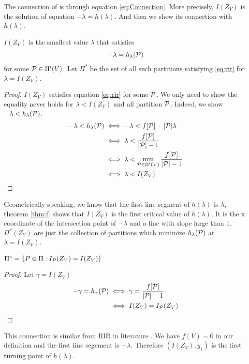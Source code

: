 \documentclass{article}
\begin{document}
The connection of  is through equation \eqref{eq:Connection}. More precisely, $I(Z_V)$
is the solution of equation $-\lambda = h(\lambda)$.
And then we show its connection with $h(\lambda)$.
\begin{theorem}\label{thm:f}
$I(Z_V)$ is the smallest value $\lambda$ that satisfies
\begin{equation}\label{eq:rir}
-\lambda = h_{\lambda}(\P)
\end{equation}
for some $\P \in \Pi'(V)$. Let $\Pi^*$ be the set of all such partitions satisfying \eqref{eq:rir}
for $\lambda = I(Z_V)$.
\end{theorem}
\begin{proof}
$I(Z_V)$ satisfies equation \eqref{eq:rir} for some $\P$. We only need to show the equality never holds for $\lambda < I(Z_V)$ and all partition $\P$. Indeed, we show $-\lambda < h_{\lambda}(\P)$.
\begin{align*}
-\lambda < h_{\lambda}(\P) &\iff -\lambda < f[\P] - \abs{\P} \lambda \\
& \iff \lambda < \frac{ f[\P] }{ \abs{\P} - 1 } \\
& \iff \lambda < \min_{\P \in \Pi'(V)} \frac{f[\P]}{  \abs{\P} - 1 } \\
& \iff \lambda < I(Z_V)
\end{align*}
\end{proof}
\begin{remark}
Geometrically speaking, we know that the first line segment of $h(\lambda)$ is $\lambda$, theorem \ref{thm:f} shows that $I(Z_V)$ is the first critical value of $h(\lambda)$. It is the x coordinate of the intersection point of $-\lambda$ and a line with slope large than 1. $\Pi^*(Z_V) $ are just the collection of partitions which minimize $h_{\lambda}(\P)$ at $\lambda = I(Z_V)$.
\end{remark}

\begin{corollary}\label{cor:F}
$\Pi^*= \{ P \in \Pi: I_{\P}(Z_V) = I(Z_V)\}$
\end{corollary}
\begin{proof}
Let $\gamma = I(Z_V)$
\begin{align*}
-\gamma = h_{\gamma}(\P) & \iff  \gamma = { f[\P] \over \abs{\P} - 1 } \\
& \iff I(Z_V) = I_{\P}(Z_V)
\end{align*}
\end{proof}
This connection is similar from RIR in literature \cite{ic}. We have $f(V)=0$ in our definition and the first line segement is $-\lambda$. Therefore
$(I(Z_V),  y_1)$ is the first turning point of $h(\lambda)$.
\end{document}

